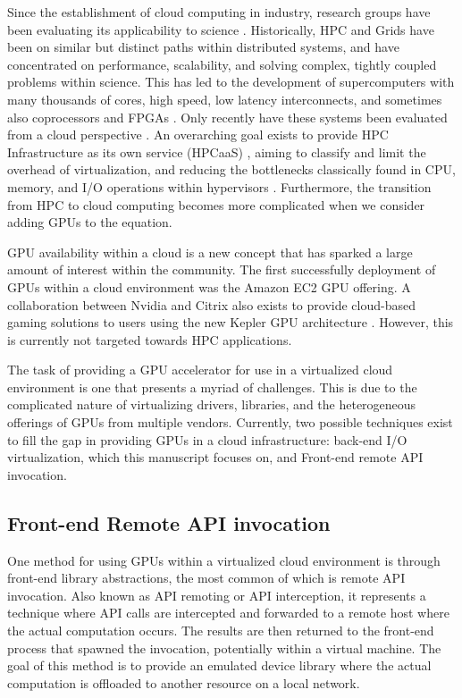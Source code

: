 Since the establishment of cloud computing in industry, research groups have been evaluating its applicability to science \cite{foster2008cca}. Historically, HPC and Grids have been on similar but distinct paths within distributed systems, and have concentrated on performance, scalability, and solving complex, tightly coupled problems within science. This has led to the development of supercomputers with many thousands of cores, high speed, low latency interconnects, and sometimes also coprocessors and FPGAs \cite{barker2008entering, craven2007examining}.  Only recently have these systems been evaluated from a cloud perspective \cite{MagellanFinal}.  An overarching goal exists to provide HPC Infrastructure as its own service (HPCaaS) \cite{shainer2009scheduling}, aiming to classify and limit the overhead of virtualization, and reducing the bottlenecks classically found in CPU, memory, and  I/O operations within hypervisors \cite{Younge2011cloud, jackson2010performance}. Furthermore, the transition from HPC to cloud computing becomes more complicated when we consider adding GPUs to the equation.


GPU availability within a cloud is a new concept that has sparked a large amount of interest within the community.  The first successfully deployment of GPUs within a cloud environment was the Amazon EC2 GPU offering.  A collaboration between Nvidia and Citrix also exists to provide cloud-based gaming solutions to users using the new Kepler GPU architecture \cite{www-nvidiacitrix}. However, this is currently not targeted towards HPC applications. 

The task of providing a GPU accelerator for use in a virtualized cloud environment is one that presents a myriad of challenges.  This is due to the complicated nature of virtualizing drivers, libraries, and the heterogeneous offerings of GPUs from multiple vendors. Currently, two possible techniques exist to fill the gap in providing GPUs in a cloud infrastructure: back-end I/O virtualization, which this manuscript focuses on, and Front-end remote API invocation.

\subsection{Front-end Remote API invocation}

One method for using GPUs within a virtualized cloud environment is through front-end library abstractions, the most common of which is remote API invocation.  Also known as API remoting or API interception, it represents a technique where API calls are intercepted and forwarded to a remote host where the actual computation occurs.  The results are then returned to the front-end process that spawned the invocation, potentially within a virtual machine.  The goal of this method is to provide an emulated device library where the actual computation is offloaded to another resource on a local network. 

